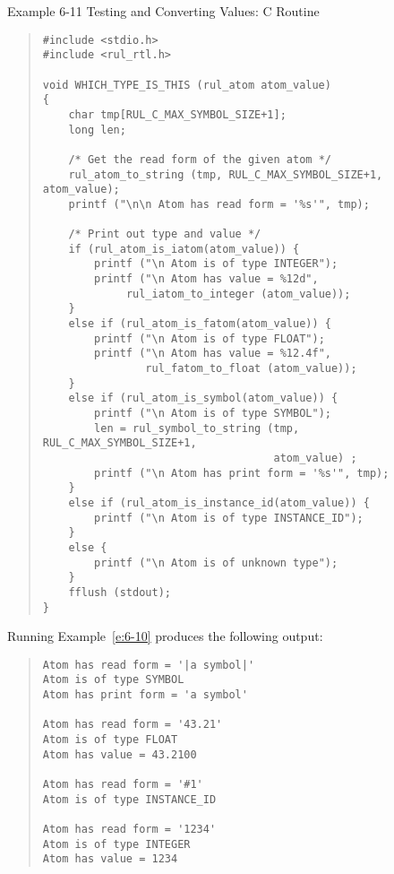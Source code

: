 Example 6-11 Testing and Converting Values: C Routine
\begin{quote}
\begin{verbatim}
#include <stdio.h>
#include <rul_rtl.h>

void WHICH_TYPE_IS_THIS (rul_atom atom_value)
{
    char tmp[RUL_C_MAX_SYMBOL_SIZE+1];
    long len;

    /* Get the read form of the given atom */
    rul_atom_to_string (tmp, RUL_C_MAX_SYMBOL_SIZE+1, atom_value);
    printf ("\n\n Atom has read form = '%s'", tmp);

    /* Print out type and value */
    if (rul_atom_is_iatom(atom_value)) {
        printf ("\n Atom is of type INTEGER");
        printf ("\n Atom has value = %12d",
             rul_iatom_to_integer (atom_value));
    }
    else if (rul_atom_is_fatom(atom_value)) {
        printf ("\n Atom is of type FLOAT");
        printf ("\n Atom has value = %12.4f", 
                rul_fatom_to_float (atom_value));
    }
    else if (rul_atom_is_symbol(atom_value)) {
        printf ("\n Atom is of type SYMBOL");
        len = rul_symbol_to_string (tmp, RUL_C_MAX_SYMBOL_SIZE+1,
                                    atom_value) ;
        printf ("\n Atom has print form = '%s'", tmp);
    }
    else if (rul_atom_is_instance_id(atom_value)) {
        printf ("\n Atom is of type INSTANCE_ID");
    }
    else {
        printf ("\n Atom is of unknown type");
    }
    fflush (stdout);
}
\end{verbatim}
\end{quote}

Running Example~\ref{e:6-10} produces the following output:

\begin{quote}
\begin{verbatim}
Atom has read form = '|a symbol|'
Atom is of type SYMBOL
Atom has print form = 'a symbol'

Atom has read form = '43.21'
Atom is of type FLOAT
Atom has value = 43.2100

Atom has read form = '#1'
Atom is of type INSTANCE_ID

Atom has read form = '1234'
Atom is of type INTEGER
Atom has value = 1234
\end{verbatim}
\end{quote}

